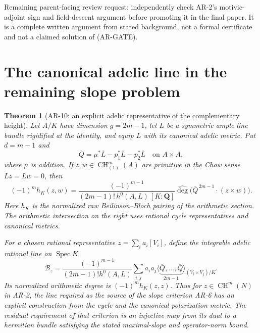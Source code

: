 \documentclass[11pt,a4paper]{article}
\newtheorem{theorem}{Theorem}[section]
\begin{document}
Remaining parent-facing review request: independently check AR-2's
motivic-adjoint sign and field-descent argument before promoting it in
the final paper. It is a complete written argument from stated
background, not a formal certificate and not a claimed solution of
(AR-GATE).
\section{The canonical adelic line in the remaining slope problem}
\label{sec:AR10}

\begin{theorem}[AR-10: an explicit adelic representative of the complementary height]
Let $A/K$ have dimension $g=2m-1$, let $L$ be a symmetric ample line
bundle rigidified at the identity, and equip $L$ with its canonical
adelic metric. Put $d=m-1$ and
\[
 \overline Q=\mu^*\overline L-p_1^*\overline L-p_2^*\overline L
 \quad\text{on }A\times A,
\]
where $\mu$ is addition. If $z,w\in\operatorname{CH}^m_{(1)}(A)$
are primitive in the Chow sense $Lz=Lw=0$, then
\begin{equation}\label{eq:AR10}
 (-1)^m h_K(z,w)=
 \frac{(-1)^{m-1}}{(2m-1)!\,h^0(A,L)\,[K:\mathbf Q]}
 \widehat{\deg}\bigl(\overline Q^{\,2m-1}\cdot(z\times w)\bigr).
\end{equation}
Here $h_K$ is the normalized raw Beilinson--Bloch pairing of the
arithmetic section. The arithmetic intersection on the right uses
rational cycle representatives and canonical metrics.

For a chosen rational representative $z=\sum_i a_i[V_i]$, define the
integrable adelic rational line on $\operatorname{Spec}K$
\[
 \overline{\mathcal B}_z=
 \frac{(-1)^{m-1}}{(2m-1)!h^0(A,L)}
 \sum_{i,j}a_i a_j
 \bigl\langle\underbrace{\overline Q,\ldots,\overline Q}_{2m-1}
 \bigr\rangle_{(V_i\times V_j)/K}.
\]
Its normalized arithmetic degree is $(-1)^m h_K(z,z)$. Thus for
$z\in\operatorname{CH}^m(N)$ in AR-2, the line required as the source
of the slope criterion AR-6 has an explicit construction from the
cycle and the canonical polarization metric. The residual requirement
of that criterion is an injective map from its dual to a hermitian
bundle satisfying the stated maximal-slope and operator-norm bound.
\end{theorem}
\end{document}
